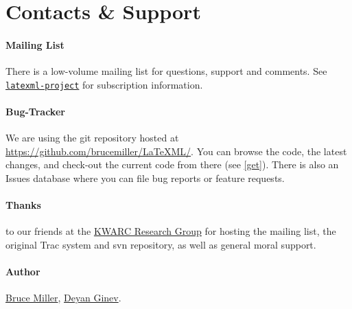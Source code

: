 \documentclass{article}
\begin{document}
\section{Contacts \& Support}\label{contact}

\paragraph{Mailing List}\label{contact.list}
There is a low-volume mailing list for questions, support and comments.
See \href{http://lists.informatik.uni-erlangen.de/mailman/listinfo/latexml}{\texttt{latexml-project}} for subscription information.

\paragraph{Bug-Tracker}\label{contact.git}
We are using the git repository hosted at
\href{https://github.com/brucemiller/LaTeXML/}{https://github.com/brucemiller/LaTeXML/}.
You can browse the code, the latest changes, and check-out the current code from
there (see \ref{get}).  There is also an Issues database where you can
file bug reports or feature requests.



\paragraph{Thanks} to our friends at
the \href{http://kwarc.info}{KWARC Research Group}
for hosting the mailing list, the original Trac system and svn repository,
as well as general moral support.

\paragraph{Author}
\href{mailto:bruce.miller@nist.gov}{Bruce Miller},
\href{mailto:deyan.ginev@gmail.com}{Deyan Ginev}.
\end{document}
